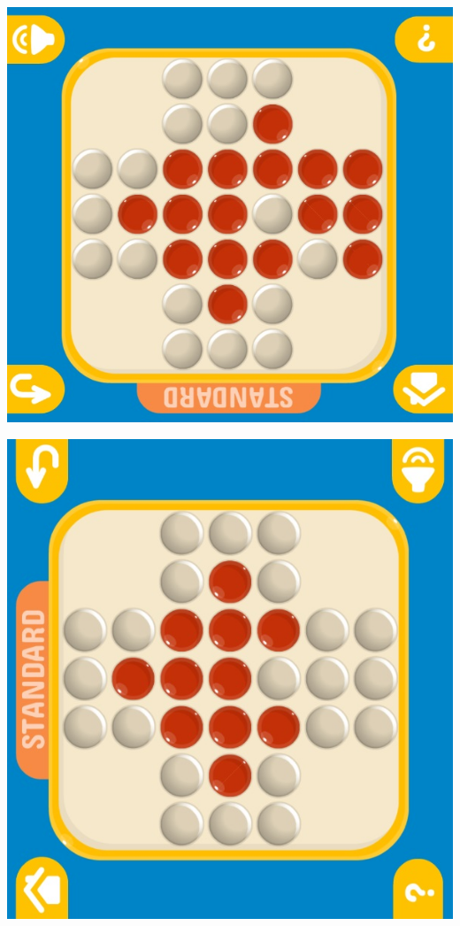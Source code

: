 \documentclass[10pt,a4paper]{report}
\begin{document}
\begin{center}
	\includegraphics[scale=.3]{12.jpg} \hspace{6cm}
	
	\includegraphics[scale=.3]{13.jpg} \hspace{6cm}
\end{center}
\end{document}
